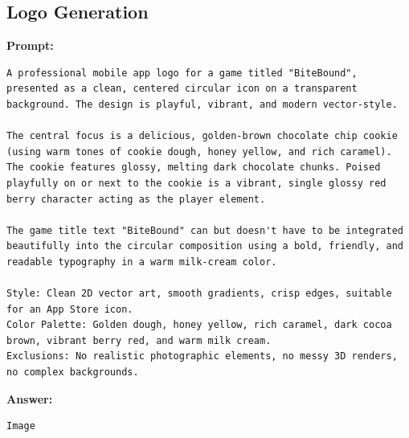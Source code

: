 \subsection*{Logo Generation}

\textbf{Prompt:}
\begin{lstlisting}[language={}, breaklines=true]
A professional mobile app logo for a game titled "BiteBound", presented as a clean, centered circular icon on a transparent background. The design is playful, vibrant, and modern vector-style.

The central focus is a delicious, golden-brown chocolate chip cookie (using warm tones of cookie dough, honey yellow, and rich caramel). The cookie features glossy, melting dark chocolate chunks. Poised playfully on or next to the cookie is a vibrant, single glossy red berry character acting as the player element.

The game title text "BiteBound" can but doesn't have to be integrated beautifully into the circular composition using a bold, friendly, and readable typography in a warm milk-cream color.

Style: Clean 2D vector art, smooth gradients, crisp edges, suitable for an App Store icon.
Color Palette: Golden dough, honey yellow, rich caramel, dark cocoa brown, vibrant berry red, and warm milk cream.
Exclusions: No realistic photographic elements, no messy 3D renders, no complex backgrounds. 
\end{lstlisting}

\textbf{Answer:}
\begin{lstlisting}[language={}, breaklines=true]
Image
\end{lstlisting}

